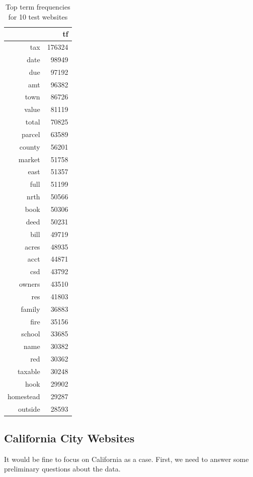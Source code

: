 \documentclass[11pt]{article}
\begin{document}
\begin{table}[ht]
	\centering
	\begin{tabular}{rr}
		\hline
		& tf \\ 
		\hline
		tax & 176324 \\ 
		date & 98949 \\ 
		due & 97192 \\ 
		amt & 96382 \\ 
		town & 86726 \\ 
		value & 81119 \\ 
		total & 70825 \\ 
		parcel & 63589 \\ 
		county & 56201 \\ 
		market & 51758 \\ 
		east & 51357 \\ 
		full & 51199 \\ 
		nrth & 50566 \\ 
		book & 50306 \\ 
		deed & 50231 \\ 
		bill & 49719 \\ 
		acres & 48935 \\ 
		acct & 44871 \\ 
		csd & 43792 \\ 
		owners & 43510 \\ 
		res & 41803 \\ 
		family & 36883 \\ 
		fire & 35156 \\ 
		school & 33685 \\ 
		name & 30382 \\ 
		red & 30362 \\ 
		taxable & 30248 \\ 
		hook & 29902 \\ 
		homestead & 29287 \\ 
		outside & 28593 \\ 
		\hline
	\end{tabular}
	\caption{Top term frequencies for 10 test websites} 
\end{table}

\subsection{California City Websites}

It would be fine to focus on California as a case. First, we need to answer some preliminary questions about the data.
\end{document}
